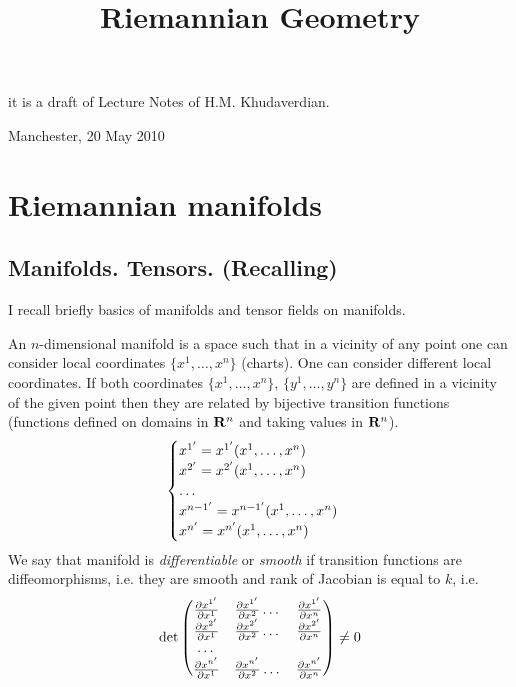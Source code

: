 \documentclass[12pt]{article}
\title{Riemannian Geometry}
\date{}
\theoremstyle{theorem}
\numberwithin{equation}{section}
\begin{document}
\maketitle

  \centerline {it is a draft of Lecture Notes of H.M. Khudaverdian.}

  \centerline { Manchester, 20 May 2010}





\tableofcontents


\section {Riemannian manifolds}


\subsection { Manifolds. Tensors. (Recalling)}


I recall briefly basics of manifolds and tensor fields on manifolds.

An $n$-dimensional manifold is a space such that in a vicinity of any point
one can consider local coordinates $\{x^1,\dots,x^n\}$ (charts). One can consider different local coordinates.
If both coordinates $\{x^1,\dots,x^n\}$, $\{y^1,\dots,y^n\}$ are defined in a vicinity of the given point
then they are related by  bijective transition functions (functions defined on domains in $\R^n$ and taking values in $\R^n$).
              $$
             \begin{cases}
             x^{1'}=x^{1'}(x^1,\dots,x^n)\cr
             x^{2'}=x^{2'}(x^1,\dots,x^n)\cr
                \dots\cr
            x^{{n-1}'}=x^{{n-1}'}(x^1,\dots,x^n)\cr
              x^{{n}'}=x^{{n}'}(x^1,\dots,x^n)\cr

             \end{cases}
              $$
 We say that manifold is {\it differentiable} or {\it smooth} if transition functions are diffeomorphisms,
i.e. they are smooth and rank of Jacobian is equal to $k$, i.e.
              \begin{equation}\label{transfunctions---diffeomorphisms}
      \det
          \begin{pmatrix}
          {\p x^{1'}\over \p x^1} &{\p x^{1'}\over \p x^2}\dots &{\p x^{1'}\over \p x^n}\cr
         {\p x^{2'}\over \p x^1} &{\p x^{2'}\over \p x^2} \dots &{\p x^{2'}\over \p x^n}\cr
                           \dots\cr
      {\p x^{n'}\over \p x^1} &{\p x^{n'}\over \p x^2}\dots &{\p x^{n'}\over \p x^n}\cr
          \end{pmatrix}\not=0
              \end{equation}
\end{document}
